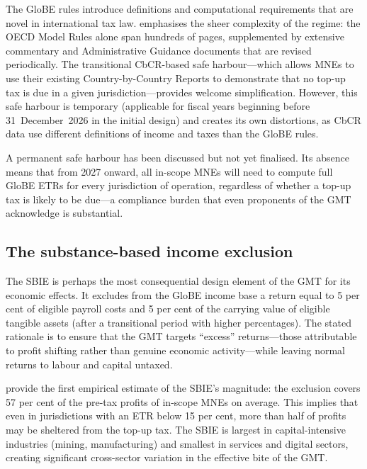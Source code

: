 \documentclass[12pt,a4paper]{article}
\begin{document}
The GloBE rules introduce definitions and computational requirements that are novel in international tax law.
\textcite{schanz2023} emphasises the sheer complexity of the regime: the OECD Model Rules alone span hundreds of pages, supplemented by extensive commentary and Administrative Guidance documents that are revised periodically.
The transitional CbCR-based safe harbour---which allows MNEs to use their existing Country-by-Country Reports to demonstrate that no top-up tax is due in a given jurisdiction---provides welcome simplification.
However, this safe harbour is temporary (applicable for fiscal years beginning before 31~December~2026 in the initial design) and creates its own distortions, as CbCR data use different definitions of income and taxes than the GloBE rules.

A permanent safe harbour has been discussed but not yet finalised.
Its absence means that from 2027 onward, all in-scope MNEs will need to compute full GloBE ETRs for every jurisdiction of operation, regardless of whether a top-up tax is likely to be due---a compliance burden that even proponents of the GMT acknowledge is substantial.

\subsection{The substance-based income exclusion}

The SBIE is perhaps the most consequential design element of the GMT for its economic effects.
It excludes from the GloBE income base a return equal to 5 per cent of eligible payroll costs and 5 per cent of the carrying value of eligible tangible assets (after a transitional period with higher percentages).
The stated rationale is to ensure that the GMT targets ``excess'' returns---those attributable to profit shifting rather than genuine economic activity---while leaving normal returns to labour and capital untaxed.

\textcite{devereux2023} provide the first empirical estimate of the SBIE's magnitude: the exclusion covers 57 per cent of the pre-tax profits of in-scope MNEs on average.
This implies that even in jurisdictions with an ETR below 15 per cent, more than half of profits may be sheltered from the top-up tax.
The SBIE is largest in capital-intensive industries (mining, manufacturing) and smallest in services and digital sectors, creating significant cross-sector variation in the effective bite of the GMT.
\end{document}
